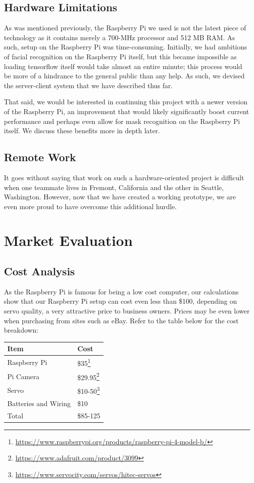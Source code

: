 \documentclass[conference, 12pt, onecolumn]{IEEEtran}
\begin{document}
\subsection{Hardware Limitations}
As was mentioned previously, the Raspberry Pi we used is not the latest piece of technology as it contains merely a 700-MHz processor and 512 MB RAM. As such, setup on the Raspberry Pi was time-consuming. Initially, we had ambitions of facial recognition on the Raspberry Pi itself, but this became impossible as loading tensorflow itself would take almost an entire minute; this process would be more of a hindrance to the general public than any help. As such, we devised the server-client system that we have described thus far.

That said, we would be interested in continuing this project with a newer version of the Raspberry Pi, an improvement that would likely significantly boost current performance and perhaps even allow for mask recognition on the Raspberry Pi itself. We discuss these benefits more in depth later.
\subsection{Remote Work}
It goes without saying that work on such a hardware-oriented project is difficult when one teammate lives in Fremont, California and the other in Seattle, Washington. However, now that we have created a working prototype, we are even more proud to have overcome this additional hurdle.
\section{Market Evaluation}
\subsection{Cost Analysis}
As the Raspberry Pi is famous for being a low cost computer, our calculations show that our Raspberry Pi setup can cost even less than \$100, depending on servo quality, a very attractive price to business owners. Prices may be even lower when purchasing from sites such as eBay. Refer to the table below for the cost breakdown:
\begin{table}[h!]
\centering
\begin{tabular}{l|l}
\hline
\multicolumn{1}{|l|}{Item} & \multicolumn{1}{l|}{Cost} \\ \hline
Raspberry Pi               & \$35\footnote{\url{https://www.raspberrypi.org/products/raspberry-pi-4-model-b/}}                      \\
Pi Camera                  & \$29.95\footnote{\url{https://www.adafruit.com/product/3099}}                  \\
Servo                      & \$10-50\footnote{\url{https://www.servocity.com/servos/hitec-servos}}             \\
Batteries and Wiring       & \$10                \\ \hline
Total                      & \$85-125           
\end{tabular}
\end{table}
\end{document}
